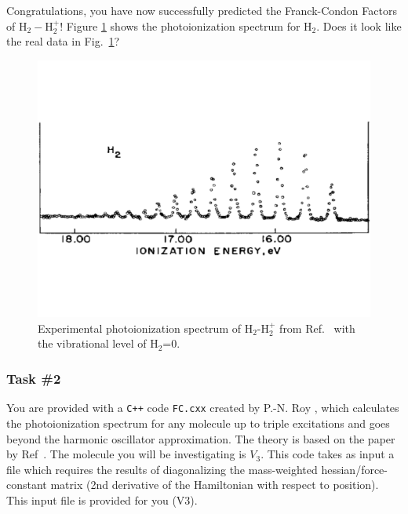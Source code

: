 \documentclass[12pt]{article}
\begin{document}
Congratulations, you have now successfully predicted the Franck-Condon Factors of H$_2-$H$_2^+$! Figure \ref{fig:h2_spectrum} shows the photoionization spectrum for H$_2$. Does it look like the real data in Fig.~\ref{fig:h2_spectrum}?

\begin{figure}
    \begin{center}
        \includegraphics[width=\linewidth]{../figures/H2-expspectrum.pdf}
    \end{center}
    \caption{
    Experimental photoionization spectrum of H$_2$-H$_2^+$ from Ref.~\cite{berkowitz1973comparison} with the vibrational level of H$_2$=0.
    }
    \label{fig:h2_spectrum}
\end{figure}

\subsubsection*{Task \#2}

You are provided with a \texttt{C++} code \texttt{FC.cxx} created by P.-N. Roy \cite{yang1995structure}, which calculates the photoionization spectrum for any molecule up to triple excitations and goes beyond the harmonic oscillator approximation. The theory is based on the paper by Ref~\cite{doktorov1977dynamical}. The molecule you will be investigating is $V_3$.
This code takes as input a file which requires the results of diagonalizing the mass-weighted hessian/force-constant matrix (2nd derivative of the Hamiltonian with respect to position). This input file is provided for you (V3).
\end{document}
